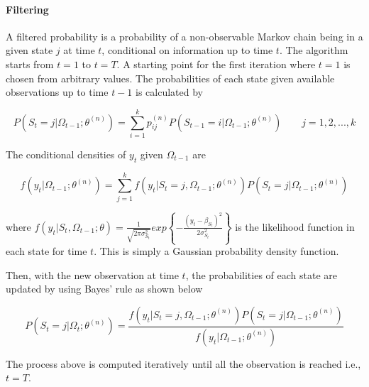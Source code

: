 \paragraph{Filtering}

A filtered probability is a probability of a non-observable Markov
chain being in a given state $j$ at time $t$, conditional on information
up to time $t$. The algorithm starts from $t=1$ to $t=T$. A starting
point for the first iteration where $t=1$ is chosen from arbitrary
values. The probabilities of each state given available observations
up to time $t-1$ is calculated by

\begin{equation}
P(S_{t}=j|\Omega_{t-1};\theta^{(n)})=\sum_{i=1}^{k}p_{ij}^{(n)}P(S_{t-1}=i|\Omega_{t-1};\theta^{(n)})\qquad j=1,2,...,k
\end{equation}

The conditional densities of $y_{t}$ given $\Omega_{t-1}$ are

\begin{equation}
f(y_{t}|\Omega_{t-1};\theta^{(n)})=\sum_{j=1}^{k}f(y_{t}|S_{t}=j,\Omega_{t-1};\theta^{(n)})P(S_{t}=j|\Omega_{t-1};\theta^{(n)})
\end{equation}

where $f(y_{t}|S_{t},\Omega_{t-1};\theta)=\frac{1}{\sqrt{2\pi\sigma_{S_{t}}^{2}}}exp\left\{ -\frac{(y_{t}-\beta_{S_{t}})^{2}}{2\sigma_{S_{t}}^{2}}\right\} $
is the likelihood function in each state for time $t$. This is simply
a Gaussian probability density function.

Then, with the new observation at time $t$, the probabilities of
each state are updated by using Bayes' rule as shown below

\begin{equation}
P(S_{t}=j|\Omega_{t};\theta^{(n)})=\frac{f(y_{t}|S_{t}=j,\Omega_{t-1};\theta^{(n)})P(S_{t}=j|\Omega_{t-1};\theta^{(n)})}{f(y_{t}|\Omega_{t-1};\theta^{(n)})}\label{eq:fProb}
\end{equation}

The process above is computed iteratively until all the observation
is reached i.e., $t=T$.

